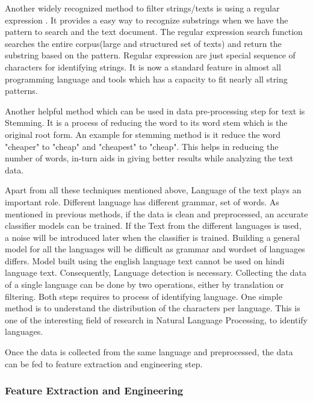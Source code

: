 Another widely recognized method to filter strings/texts is using a regular expression \cite{Thompson}. It provides a easy way to recognize substrings when we have the pattern to search and the text document. The regular expression search function searches the entire corpus(large and structured set of texts) and return the substring based on the pattern. Regular expression are just special sequence of characters for identifying strings. It is now a standard feature in almost all programming language and tools which has a capacity to fit nearly all string patterns.   

Another helpful method which can be used in data pre-processing step for text is Stemming. It is a process of reducing the word to its word stem which is the original root form. An example for stemming method is it reduce the word "cheaper" to "cheap" and "cheapest" to "cheap". This helps in reducing the number of words, in-turn aids in giving better results while analyzing the text data.

Apart from all these techniques mentioned above, Language of the text plays an important role. Different language has different grammar, set of words. As mentioned in previous methods, if the data is clean and preprocessed, an  accurate classifier models can be trained. If the Text from the different languages is used, a noise will be introduced later when the classifier is trained. Building a general model for all the languages will be difficult as grammar and wordset of languages differs. Model built using the english language text cannot be used on hindi language text. Consequently, Language detection is necessary. Collecting the data of a single language can be done by two operations, either by translation or filtering. Both steps requires to process of identifying language. One simple method is to understand the distribution of the characters per language. This is one of the interesting field of research in Natural Language Processing, to identify languages. 

Once the data is collected from the same language and preprocessed, the data can be fed to feature extraction and engineering step.

\subsubsection{Feature Extraction and Engineering} \label{backgroundworkFeatureEngi}

